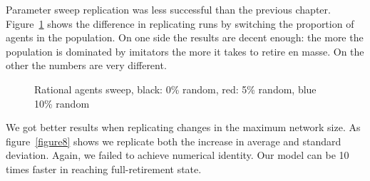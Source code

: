 \documentclass[runningheads,a4paper]{llncs}
\begin{document}
Parameter sweep replication was less successful than the previous chapter.
Figure~\ref{figure6} shows the difference in replicating runs by switching the proportion of agents in the population.
On one side the results are decent enough: the more the population is dominated by imitators the more it takes to retire en masse.
On the other the numbers are very different.

\begin{figure}
\centering

\caption{Rational agents sweep, black: 0\% random, red: 5\% random, blue 10\% random}
\label{figure6}
\end{figure}

We got better results when replicating changes in the maximum network size.
As figure~\ref{figure8} shows we replicate both the increase in average and standard deviation.
Again, we failed to achieve numerical identity.
Our model can be 10 times faster in reaching full-retirement state.
\end{document}
